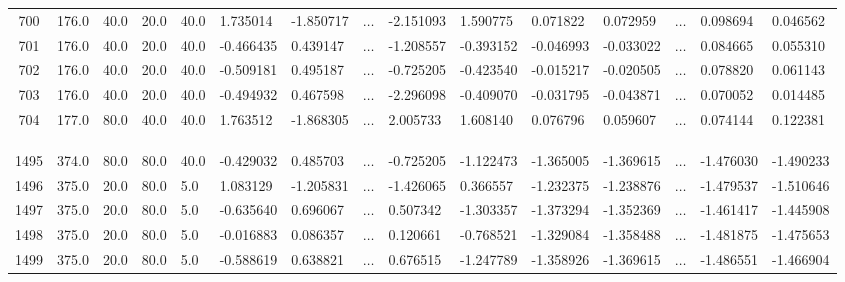 \begin{table}
{\begin{tabular}{cp{1.3cm}p{0.8cm}p{0.8cm}p{0.8cm}p{1.8cm}p{1.8cm}p{0.3cm}p{1.6cm}p{1.6cm}p{1.6cm}p{1.6cm}p{0.3cm}p{1.6cm}p{1.6cm}}
		700 &     176.0 &  40.0 &  20.0 &  40.0 &        1.735014 &       -1.850717 & $\dots$&            -2.151093 &      1.590775 &      0.071822 &      0.072959 & $\dots$&          0.098694 &          0.046562 \\
		701 &     176.0 &  40.0 &  20.0 &  40.0 &       -0.466435 &        0.439147 & $\dots$&           -1.208557 &     -0.393152 &     -0.046993 &     -0.033022 &$\dots$&           0.084665 &          0.055310 \\
		702 &     176.0 &  40.0 &  20.0 &  40.0 &       -0.509181 &        0.495187 &  $\dots$&          -0.725205 &     -0.423540 &     -0.015217 &     -0.020505 & $\dots$&          0.078820 &          0.061143 \\
		703 &     176.0 &  40.0 &  20.0 &  40.0 &       -0.494932 &        0.467598 & $\dots$&           -2.296098 &     -0.409070 &     -0.031795 &     -0.043871 & $\dots$&          0.070052 &          0.014485 \\
		704 &     177.0 &  80.0 &  40.0 &  40.0 &        1.763512 &       -1.868305 &  $\dots$&           2.005733 &      1.608140 &      0.076796 &      0.059607 &$\dots$&           0.074144 &          0.122381 \\
		
		\bottomrule
		&&&&&&&&&&&&&&\\
		&&&&&&&\sbox0{\dots}\makebox[\wd0]{\vdots}&&&&&&&\\
		&&&&&&&&&&&&&&\\
		\toprule
		
		1495 &     374.0 &  80.0 &  80.0 &  40.0 &       -0.429032 &        0.485703 & $\dots$&          -0.725205 &     -1.122473 &     -1.365005 &     -1.369615 &$\dots$&         -1.476030 &         -1.490233 \\
		1496 &     375.0 &  20.0 &  80.0 &   5.0 &        1.083129 &       -1.205831 & $\dots$&          -1.426065 &      0.366557 &     -1.232375 &     -1.238876 & $\dots$&        -1.479537 &         -1.510646 \\
		1497 &     375.0 &  20.0 &  80.0 &   5.0 &       -0.635640 &        0.696067 & $\dots$&           0.507342 &     -1.303357 &     -1.373294 &     -1.352369 & $\dots$&        -1.461417 &         -1.445908 \\
		1498 &     375.0 &  20.0 &  80.0 &   5.0 &       -0.016883 &        0.086357 &  $\dots$&          0.120661 &     -0.768521 &     -1.329084 &     -1.358488 & $\dots$&        -1.481875 &         -1.475653 \\
		1499 &     375.0 &  20.0 &  80.0 &   5.0 &       -0.588619 &        0.638821 &  $\dots$ &          0.676515 &     -1.247789 &     -1.358926 &     -1.369615 & $\dots$&        -1.486551 &         -1.466904 \\
		\bottomrule[0.5mm]
	\end{tabular}}
\end{table}




